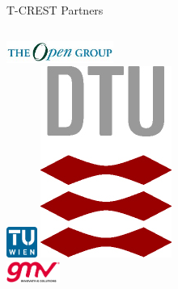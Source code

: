 \documentclass[17pt]{beamer}
\begin{document}
\begin{frame}{T-CREST Partners}
  \begin{columns}
    \begin{column}{3.5cm}
      \includegraphics[width=3.5cm]{logos/TOG}\\
      \vskip1cm
      \includegraphics[width=1cm]{logos/TULogo2}
      \includegraphics[width=.85cm]{logos/DTU}\\
      \vskip1cm
      \includegraphics[width=1.75cm]{logos/GMV}
    \end{column}
  \end{columns}
\end{frame}
\end{document}
